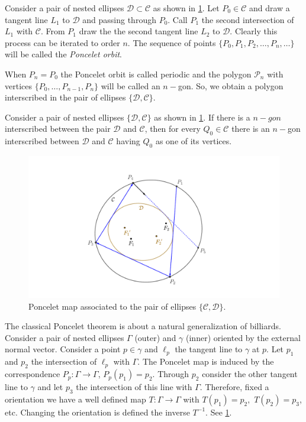 Consider a pair of nested ellipses $\mathcal{D}\subset \mathcal{C}$ as shown in \cref{fig:poncelet}. Let $P_0\in \mathcal{C}$ and draw a tangent line $L_1$ to $\mathcal{D}$ and passing through $P_0$. Call $P_1$ the second intersection of $L_1$ with $\mathcal{C}.$
From $P_1$ draw the the second tangent line $L_2$ to $\mathcal{D}.$
Clearly this process can be iterated to order $n. $
The sequence of points $\{P_0,P_1,P_2,\ldots, P_n,\ldots\}$ will be called the {\em Poncelet orbit}.

When $P_n=P_0$ the Poncelet orbit is called periodic and the polygon $\mathcal{P}_n$ with vertices $\{P_0,\ldots, P_{n-1}, P_n\}$ will be called an $n-$gon. So, we obtain a polygon interscribed in the pair of ellipses $\{\mathcal{D},\mathcal{C}\}.$

\begin{theorem}  Consider a pair of nested ellipses $\{\mathcal{D},\mathcal{C}\}$ as shown in \cref{fig:poncelet}. If there is a $n-gon$ interscribed between the pair $\mathcal{D}$ and $\mathcal{C}$, then for every $Q_0\in \mathcal{C}$ there is an $n-$gon interscribed between $\mathcal{D}$ and $\mathcal{C}$ having $Q_0$ as one of its vertices.

\label{th:poncelet}
\end{theorem}


\begin{figure}
\begin{center}
\includegraphics[scale=0.7]{pics_tex/poncelet_map.pdf}
\end{center}
\caption{Poncelet map associated to the pair of ellipses $\{\mathcal{C},\mathcal{D}\}.$}
\label{fig:poncelet}
\end{figure}

The classical Poncelet theorem is about a natural generalization of billiards. Consider a pair of nested ellipses $\Gamma$ (outer) and $\gamma$ (inner) oriented by the external normal vector.
Consider a point $p\in \gamma$ and  $\ell_p$ the   tangent line  to $\gamma$ at $p$. Let $p_1$ and $p_2$ the intersection of  $\ell_p$ with $\Gamma.$ The Poncelet map is induced by the correspondence
$P_p:\Gamma\to\Gamma$, $P_p(p_1)=p_2$. Through $p_2$ consider the other tangent line to $\gamma$ and let $p_3$ the intersection of this line with $\Gamma$. Therefore, fixed a orientation we have a well defined map $T:\Gamma\to \Gamma$ with $T(p_1)=p_2,$ $T(p_2)=p_3$, etc. 
Changing the orientation is defined the inverse $T^{-1}.$ See  \cref{fig:poncelet}.

